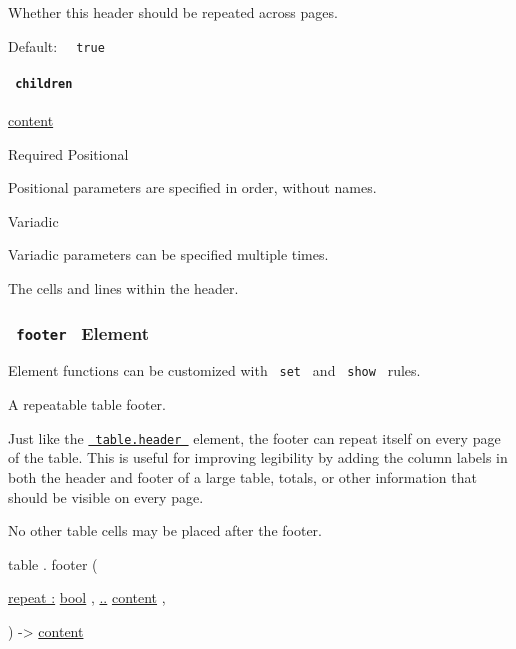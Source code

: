 Whether this header should be repeated across pages.

Default: \texttt{\ }{\texttt{\ true\ }}\texttt{\ }

\paragraph{\texorpdfstring{\texttt{\ children\ }}{ children }}\label{definitions-header-children}

\href{/docs/reference/foundations/content/}{content}

{Required} {{ Positional }}

\label{definitions-header-children-positional-tooltip}
Positional parameters are specified in order, without names.

{{ Variadic }}

\label{definitions-header-children-variadic-tooltip}
Variadic parameters can be specified multiple times.

The cells and lines within the header.

\subsubsection{\texorpdfstring{\texttt{\ footer\ } {{ Element
}}}{ footer   Element }}\label{definitions-footer}

\label{definitions-footer-element-tooltip}
Element functions can be customized with \texttt{\ set\ } and
\texttt{\ show\ } rules.

A repeatable table footer.

Just like the
\href{/docs/reference/model/table/\#definitions-header}{\texttt{\ table.header\ }}
element, the footer can repeat itself on every page of the table. This
is useful for improving legibility by adding the column labels in both
the header and footer of a large table, totals, or other information
that should be visible on every page.

No other table cells may be placed after the footer.

table { . } { footer } (

{ \hyperref[definitions-footer-parameters-repeat]{repeat :}
\href{/docs/reference/foundations/bool/}{bool} , } {
\hyperref[definitions-footer-parameters-children]{..}
\href{/docs/reference/foundations/content/}{content} , }

) -\textgreater{} \href{/docs/reference/foundations/content/}{content}

